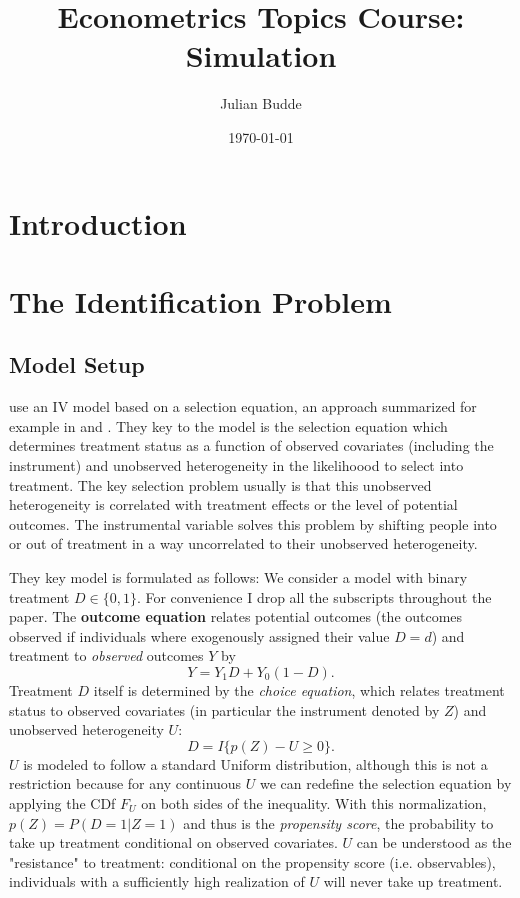\documentclass{article}
\title{\Large Econometrics Topics Course: Simulation}
\author{Julian Budde}
\date{\today}
\begin{document}
\maketitle

\tableofcontents

\section{Introduction}

\section{The Identification Problem}
\subsection{Model Setup}
\citet{mogstad2018using} use an IV model based on a selection equation, an approach summarized for example in \citet{heckman2007econometric1} and \citet{heckman2007econometric2}.
They key to the model is the selection equation which determines treatment status as a function of observed covariates (including the instrument) and unobserved heterogeneity in the likelihoood to select into treatment.
The key selection problem usually is that this unobserved heterogeneity is correlated with treatment effects or the level of potential outcomes.
The instrumental variable solves this problem by shifting people into or out of treatment in a way uncorrelated to their unobserved heterogeneity.

They key model is formulated as follows: We consider a model with binary treatment $D\in\{0,1\}$. For convenience I drop all the subscripts throughout the paper.
The \textbf{outcome equation} relates potential outcomes (the outcomes observed if individuals where exogenously assigned their value $D=d$) and treatment to \textit{observed} outcomes $Y$ by
\begin{equation}
    Y = Y_1D + Y_0(1-D).
\end{equation}
Treatment $D$ itself is determined by the \textit{choice equation}, which relates treatment status to observed covariates (in particular the instrument denoted by $Z$) and unobserved heterogeneity $U$:
\begin{equation}
    D = I\{p(Z) - U \geq 0\}.
\end{equation}
$U$ is modeled to follow a standard Uniform distribution, although this is not a restriction because for any continuous $U$ we can redefine the selection equation by applying the CDf $F_U$ on both sides of the inequality.
With this normalization, $p(Z) = P(D=1|Z=1)$ and thus is the \textit{propensity score}, the probability to take up treatment conditional on observed covariates.
$U$ can be understood as the "resistance" to treatment: conditional on the propensity score (i.e. observables), individuals with a sufficiently high realization of $U$ will never take up treatment.  
\end{document}
